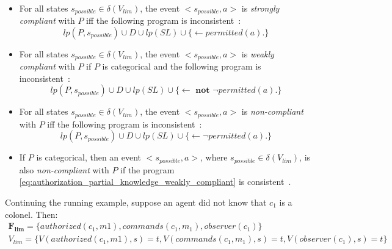 \begin{definition}
    \label{def:authorization_event_compliance_partial_knowledge}
    ~

    \begin{itemize}
        \item For all states $s_{possible} \in \delta(V_{lim})$, the event $<s_{possible}, a>$ is \textit{strongly compliant} with $P$ iff the following program is inconsistent~\citep{gelfond_authorization_2008}:
            \begin{equation}
                \label{eq:authorization_partial_knowledge_strongly_compliant}
                lp(P, s_{possible}) \cup D \cup lp(SL) \cup \{ \leftarrow permitted(a). \}
            \end{equation}
        \item For all states $s_{possible} \in \delta(V_{lim})$, the event $<s_{possible}, a>$ is \textit{weakly compliant} with $P$ if $P$ is categorical and the following program is inconsistent~\citep{gelfond_authorization_2008}:
            \begin{equation}
                \label{eq:authorization_partial_knowledge_weakly_compliant}
                lp(P, s_{possible}) \cup D \cup lp(SL) \cup \{ \leftarrow \textbf{ not } \neg permitted(a). \}
            \end{equation}
        \item For all states $s_{possible} \in \delta(V_{lim})$, the event $<s_{possible}, a>$ is \textit{non-compliant} with $P$ iff the following program is inconsistent~\citep{gelfond_authorization_2008}:
            \begin{equation}
                \label{eq:authorization_partial_knowledge_non_compliant}
                lp(P, s_{possible}) \cup D \cup lp(SL) \cup \{ \leftarrow \neg permitted(a). \}
            \end{equation}
        \item If $P$ is categorical, then an event $<s_{possible}, a>$, where $s_{possible} \in \delta(V_{lim})$, is also \textit{non-compliant} with $P$ if the program \cref{eq:authorization_partial_knowledge_weakly_compliant} is consistent~\citep{gelfond_authorization_2008}.
    \end{itemize}
\end{definition}

Continuing the running example, suppose an agent did not know that $c_1$ is a colonel. Then:
\begin{gather}
    \boldsymbol{F_{lim}} = \{ authorized(c_1, m1), commands(c_1, m_1), observer(c_1) \} \\
    V_{lim} = \{ V(authorized(c_1, m1), s) = t, V(commands(c_1, m_1), s) = t, V(observer(c_1), s) = t \}
\end{gather}

